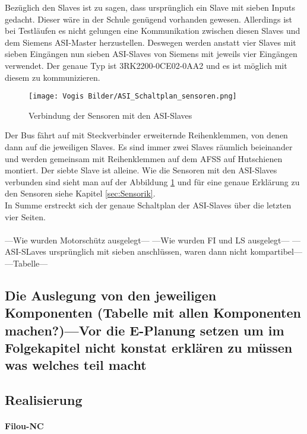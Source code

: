     Bezüglich den Slaves ist zu sagen, dass ursprünglich ein Slave mit sieben Inputs gedacht. Dieser wäre in der Schule genügend vorhanden gewesen. Allerdings ist bei Testläufen es nicht gelungen eine Kommunikation zwischen diesen Slaves und dem Siemens ASI-Master herzustellen. Deswegen werden anstatt vier Slaves mit sieben Eingängen nun sieben ASI-Slaves von Siemens mit jeweils vier Eingängen verwendet. Der genaue Typ ist 3RK2200-0CE02-0AA2 und es ist möglich mit diesem zu kommunizieren.\\
    \begin{figure}[h]
        \centering
        \texttt{[image: Vogis Bilder/ASI\_Schaltplan\_sensoren.png]}
        \caption{Verbindung der Sensoren mit den ASI-Slaves}
        \label{fig:ASI_Sensoren}
    \end{figure}
    Der Bus fährt auf mit Steckverbinder erweiternde Reihenklemmen, von denen dann auf die jeweiligen Slaves. Es sind immer zwei Slaves räumlich beieinander und werden gemeinsam mit Reihenklemmen auf dem AFSS auf Hutschienen montiert. Der siebte Slave ist alleine. Wie die Sensoren mit den ASI-Slaves verbunden sind sieht man auf der Abbildung \ref{fig:ASI_Sensoren} und für eine genaue Erklärung zu den Sensoren siehe Kapitel \ref{sec:Sensorik}.\\
    In Summe erstreckt sich der genaue Schaltplan der ASI-Slaves über die letzten vier Seiten.\\\\
    ---Wie wurden Motorschütz ausgelegt---
    ---Wie wurden FI und LS ausgelegt---
    ---ASI-SLaves ursprünglich mit sieben anschlüssen, waren dann nicht kompartibel---
    ---Tabelle--- 
\subsection{Die Auslegung von den jeweiligen Komponenten (Tabelle mit allen Komponenten machen?)---Vor die E-Planung setzen um im Folgekapitel nicht konstat erklären zu müssen was welches teil macht}
\subsection{Realisierung}
    \paragraph{Filou-NC}\mbox{}\\




